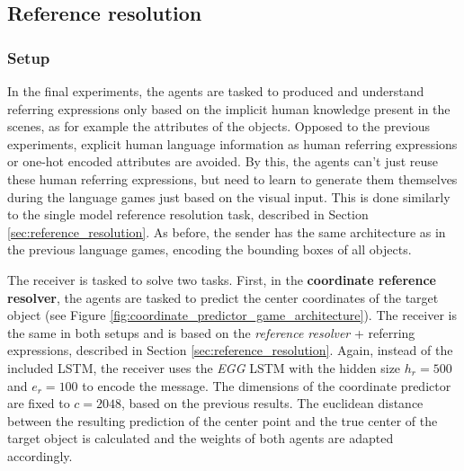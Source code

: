 \subsection{Reference resolution}
\subsubsection*{Setup}
In the final experiments, the agents are tasked to produced and understand referring expressions only based on the implicit human knowledge present in the scenes, as for example the attributes of the objects.
Opposed to the previous experiments, explicit human language information as human referring expressions or one-hot encoded attributes are avoided.
By this, the agents can't just reuse these human referring expressions, but need to learn to generate them themselves during the language games just based on the visual input.
This is done similarly to the single model reference resolution task, described in Section \ref{sec:reference_resolution}.
As before, the sender has the same architecture as in the previous language games, encoding the bounding boxes of all objects.

The receiver is tasked to solve two tasks.
First, in the \textbf{coordinate reference resolver}, the agents are tasked to predict the center coordinates of the target object (see Figure \ref{fig:coordinate_predictor_game_architecture}).
The receiver is the same in both setups and is based on the \emph{reference resolver} + referring expressions, described in Section \ref{sec:reference_resolution}.
Again, instead of the included LSTM, the receiver uses the \emph{EGG} LSTM with the hidden size $h_r=500$ and $e_r=100$ to encode the message.
The dimensions of the coordinate predictor are fixed to $c=2048$, based on the previous results.
The euclidean distance between the resulting prediction of the center point and the true center of the target object is calculated and the weights of both agents are adapted accordingly.

